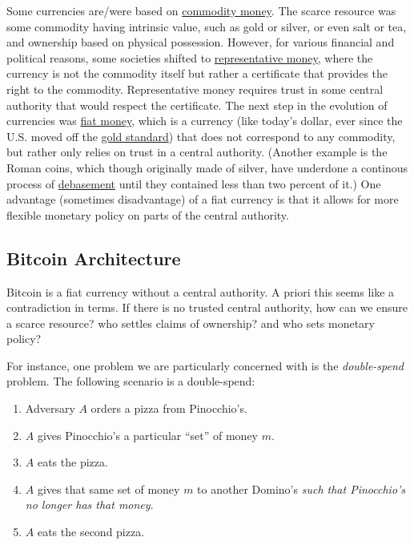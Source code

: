 Some currencies are/were based on \href{https://goo.gl/K7awAW}{commodity
money}. The scarce resource was some commodity having intrinsic value,
such as gold or silver, or even salt or tea, and ownership based on
physical possession. However, for various financial and political
reasons, some societies shifted to
\href{https://goo.gl/K6c4qP}{representative money}, where the currency
is not the commodity itself but rather a certificate that provides the
right to the commodity. Representative money requires trust in some
central authority that would respect the certificate. The next step in
the evolution of currencies was
\href{https://en.wikipedia.org/wiki/Fiat_money}{fiat money}, which is a
currency (like today's dollar, ever since the U.S. moved off the
\href{https://goo.gl/SPN5BS}{gold standard}) that does not correspond to
any commodity, but rather only relies on trust in a central authority.
(Another example is the Roman coins, which though originally made of
silver, have underdone a continous process of
\href{https://goo.gl/ZDkGzL}{debasement} until they contained less than
two percent of it.) One advantage (sometimes disadvantage) of a fiat
currency is that it allows for more flexible monetary policy on parts of
the central authority.

\subsection{Bitcoin Architecture}\label{7-Bitcoin-Architecture}

Bitcoin is a fiat currency without a central authority. A priori this
seems like a contradiction in terms. If there is no trusted central
authority, how can we ensure a scarce resource? who settles claims of
ownership? and who sets monetary policy?

For instance, one problem we are particularly concerned with is the
\emph{double-spend} problem. The following scenario is a double-spend:

\begin{enumerate}
\def\labelenumi{\arabic{enumi}.}
\tightlist
\item
  Adversary \(A\) orders a pizza from Pinocchio's.
\item
  \(A\) gives Pinocchio's a particular ``set'' of money \(m\).
\item
  \(A\) eats the pizza.
\item
  \(A\) gives that same set of money \(m\) to another Domino's
  \emph{such that Pinocchio's no longer has that money}.
\item
  \(A\) eats the second pizza.
\end{enumerate}

